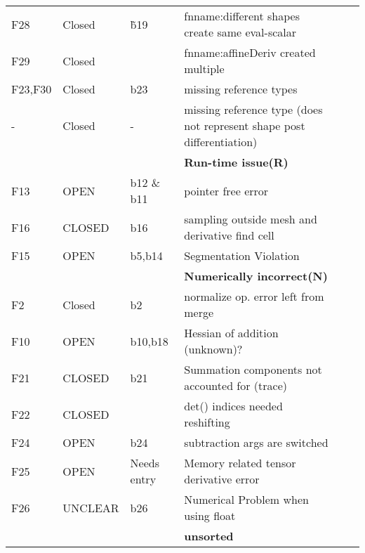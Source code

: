 \documentclass{article}
\begin{document}
\begin{tabular}{|l|ll|lll|}
 F28 & Closed & \~ b19 & fnname:different shapes create same eval-scalar\\
  F29 & Closed && fnname:affineDeriv created multiple\\
    F23,F30 & Closed &b23& missing reference types\\
    - & Closed & - & missing reference type (does not represent shape post differentiation)\\
   \hline
  \hline
 &&& \textbf{Run-time issue(R)}\\
 \hline
  F13 &OPEN & b12 \& b11  &pointer free error\\
    F16 &CLOSED & b16  & sampling outside mesh and derivative find cell  \\
   F15 &OPEN&b5,b14 &Segmentation Violation\\
  \hline
  \hline
 &&& \textbf{Numerically incorrect(N)}\\
 \hline 
  F2 &Closed &b2  & normalize op. error left from merge\\
  F10 &OPEN &b10,b18 &  Hessian of addition (unknown)?\\
   F21  &CLOSED&b21 &Summation components not accounted for (trace)\\
     F22  &CLOSED& & det() indices needed reshifting\\
     F24  &OPEN& b24& subtraction args are switched \\
     F25  &OPEN& Needs entry & Memory related tensor derivative error \\
     F26  &UNCLEAR& b26 & Numerical Problem when using float \\
  \hline
  \hline
 &&& \textbf{unsorted}\\
 \hline
\end{tabular}
\\





\end{document}
